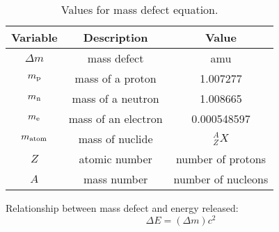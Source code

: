 \documentclass[10pt]{article}
\begin{document}
\begin{table}[H]
    \centering
    \caption{Values for mass defect equation.}
        \begin{tabular}{ccc}
            \toprule
               Variable & Description & Value \\
               \midrule
               $\Delta m$ & mass defect & amu \\
               $m_\textnormal{p}$ & mass of a proton & 1.007277 \\
               $m_\textnormal{n}$ & mass of a neutron & 1.008665 \\
               $m_\textnormal{e}$ & mass of an electron & 0.000548597 \\
               $m_\textnormal{atom}$ & mass of nuclide & $^A_Z X$\\
               $Z$ & atomic number & number of protons \\
               $A$ & mass number & number of nucleons \\
            \bottomrule
        \end{tabular}
    \label{tabgrav}
\end{table}

Relationship between mass defect and energy released: 
\begin{equation*}
\Delta E = (\Delta m)c^2
\end{equation*}
\end{document}
